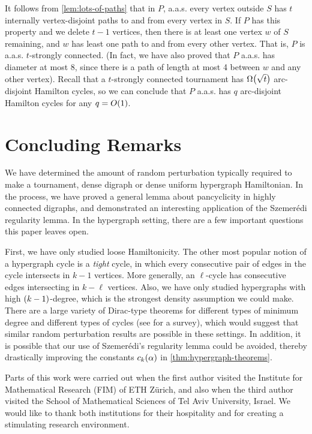 \documentclass[11pt,english]{article}
\theoremstyle{plain}
\theoremstyle{definition}
\theoremstyle{definition}
\theoremstyle{plain}
\theoremstyle{plain}
\theoremstyle{plain}
\theoremstyle{plain}
\theoremstyle{remark}
\theoremstyle{remark}
\let\originalleft\left
\let\originalright\right
\renewcommand{\left}{\mathopen{}\mathclose\bgroup\originalleft}
\renewcommand{\right}{\aftergroup\egroup\originalright}
\begin{document}
It follows from \ref{lem:lots-of-paths} that in $P$, a.a.s.{} every vertex
outside $S$ has $t$ internally vertex-disjoint paths to and from every vertex in $S$.
If $P$ has this property and we delete $t-1$ vertices, then there is at least one vertex $w$
of $S$ remaining, and $w$ has least one path to and from every other
vertex. That is, $P$ is a.a.s.{} $t$-strongly connected. (In fact, we have also
proved that $P$ a.a.s.{} has diameter at most 8, since there is a path of length at most 4 between $w$ and any other vertex). Recall that a $t$-strongly connected tournament has $\Omega\left(\sqrt t\right)$ arc-disjoint Hamilton cycles, so we can conclude that $P$ a.a.s.{} has $q$ arc-disjoint Hamilton cycles for any $q=O\left(1\right)$.


\section{Concluding Remarks}

We have determined the amount of random perturbation typically required to make
a tournament, dense digraph or dense uniform hypergraph Hamiltonian. In
the process, we have proved a general lemma about pancyclicity in
highly connected digraphs, and demonstrated an interesting application
of the Szemer\'edi regularity lemma. In the hypergraph setting, there are a few important questions
this paper leaves open.

First, we have only studied loose Hamiltonicity. The other most popular
notion of a hypergraph cycle is a \emph{tight} cycle, in which every
consecutive pair of edges in the cycle intersects in $k-1$ vertices.
More generally, an $\ell$-cycle has consecutive edges intersecting
in $k-\ell$ vertices. Also, we have only studied hypergraphs with
high $\left(k-1\right)$-degree, which is the strongest density assumption
we could make. There are a large variety of Dirac-type theorems for
different types of minimum degree and different types of cycles (see
\cite{RR10} for a survey), which would suggest that similar random
perturbation results are possible in these settings. In addition,
it is possible that our use of Szemer\'edi's regularity lemma could
be avoided, thereby drastically improving the constants $\chyp\left(\alpha\right)$
in \ref{thm:hypergraph-theorems}.

\medskip

 Parts of this work were carried out when the first author visited the Institute for Mathematical Research (FIM) of ETH Z\"urich, and also when the third author visited the School of Mathematical Sciences of Tel Aviv University, Israel. We would like to thank both institutions for their hospitality and for creating a stimulating research environment.
\end{document}
